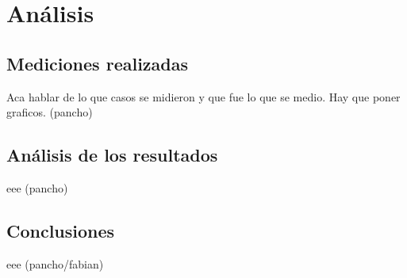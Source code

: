 \section{An\'alisis}

\subsection{Mediciones realizadas}
Aca hablar de lo que casos se midieron y que fue lo que se medio.
Hay que poner graficos.
(pancho)

\subsection{An\'alisis de los resultados}
eee (pancho)

\subsection{Conclusiones}
eee (pancho/fabian)
